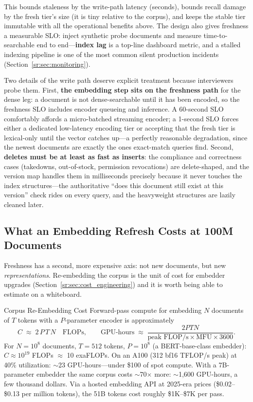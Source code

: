 This bounds staleness by the write-path latency (seconds), bounds recall damage by the fresh tier's size (it is tiny relative to the corpus), and keeps the stable tier immutable with all the operational benefits above. The design also gives freshness a measurable SLO: inject synthetic probe documents and measure time-to-searchable end to end---\textbf{index lag} is a top-line dashboard metric, and a stalled indexing pipeline is one of the most common silent production incidents (Section~\ref{sr:sec:monitoring}).

Two details of the write path deserve explicit treatment because interviewers probe them. First, \textbf{the embedding step sits on the freshness path} for the dense leg: a document is not dense-searchable until it has been encoded, so the freshness SLO includes encoder queueing and inference. A 60-second SLO comfortably affords a micro-batched streaming encoder; a 1-second SLO forces either a dedicated low-latency encoding tier or accepting that the fresh tier is lexical-only until the vector catches up---a perfectly reasonable degradation, since the newest documents are exactly the ones exact-match queries find. Second, \textbf{deletes must be at least as fast as inserts}: the compliance and correctness cases (takedowns, out-of-stock, permission revocations) are delete-shaped, and the version map handles them in milliseconds precisely because it never touches the index structures---the authoritative ``does this document still exist at this version'' check rides on every query, and the heavyweight structures are lazily cleaned later.

\subsection{What an Embedding Refresh Costs at 100M Documents}

Freshness has a second, more expensive axis: not new documents, but new \textit{representations}. Re-embedding the corpus is the unit of cost for embedder upgrades (Section~\ref{sr:sec:cost_engineering}) and it is worth being able to estimate on a whiteboard.

\begin{mathresult}{Corpus Re-Embedding Cost}
Forward-pass compute for embedding $N$ documents of $T$ tokens with a $P$-parameter encoder is approximately
\[
C \;\approx\; 2\,P\,T\,N \quad \text{FLOPs}, \qquad
\text{GPU-hours} \;\approx\; \frac{2PTN}{\text{peak FLOP/s} \times \text{MFU} \times 3600}.
\]
For $N = 10^8$ documents, $T = 512$ tokens, $P = 10^8$ (a BERT-base-class embedder): $C \approx 10^{19}$ FLOPs $\approx$ 10 exaFLOPs. On an A100 (312 bf16 TFLOP/s peak) at 40\% utilization: $\sim$23 GPU-hours---under \$100 of spot compute. With a 7B-parameter embedder the same corpus costs $\sim$70$\times$ more: $\sim$1{,}600 GPU-hours, a few thousand dollars. Via a hosted embedding API at 2025-era prices (\$0.02--\$0.13 per million tokens), the 51B tokens cost roughly \$1K--\$7K per pass.
\end{mathresult}

